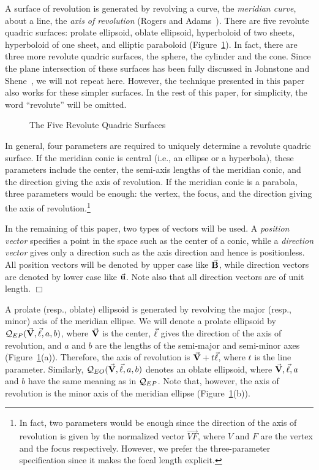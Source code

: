      A surface of revolution is generated by revolving a curve, the
{\em meridian curve}, about a line, the {\em axis of revolution}
(Rogers and Adams~\cite{rogers-adams:1990}).  There are five revolute quadric 
surfaces: prolate ellipsoid, oblate ellipsoid, hyperboloid of two sheets, 
hyperboloid of one sheet, and elliptic paraboloid (Figure~\ref{fig:revQ}).  
In fact, there are three more revolute quadric surfaces, the sphere, the 
cylinder and the cone.  Since the plane intersection of these surfaces has
been fully discussed in Johnstone and Shene~\cite{johnstone-shene:1991}, we 
will not repeat here.  However, the technique presented in this paper also
works for these simpler surfaces.  In the rest of this paper, for simplicity, 
the word ``revolute'' will be omitted.
\begin{figure}
\vspace{16.5cm}
\caption{The Five Revolute Quadric Surfaces}
\label{fig:revQ}
\end{figure}

     In general, four parameters are required to uniquely determine a revolute
quadric surface.  If the meridian conic is central (i.e., an ellipse or a 
hyperbola), these parameters include the center, the semi-axis lengths of the 
meridian conic, and  the direction giving the axis of revolution.  If the 
meridian conic is a parabola, three parameters would be enough: the vertex, 
the focus, and the direction giving the axis of revolution.\footnote{In fact,
two parameters would be enough since the direction of the axis of revolution
is given by the normalized vector $\stackrel{\longrightarrow}{VF}$, where
$V$ and $F$ are the vertex and the focus respectively.  However, we prefer the
three-parameter specification since it makes the focal length explicit.}

\begin{remark} \rm
     In the remaining of this paper, two types of vectors will be used.  
A {\em position vector} specifies a point in the space such as the center of
a conic, while a {\em direction vector} gives only a direction such as the
axis direction and hence is positionless.  All position vectors will be 
denoted by upper case like $\vec{\bf B}$, while direction vectors are denoted by
lower case like $\vec{\bf u}$.  Note also that all direction vectors are of unit 
length. $\Box$
\end{remark}

     A prolate (resp., oblate) ellipsoid is generated by revolving the major
(resp., minor) axis of the meridian ellipse.  We will denote a prolate 
ellipsoid by ${\cal Q}_{EP}(\vec{\bf V},\vec{\bf \ell},a,b)$, where $\vec{\bf V}$ is
the center, $\vec{\bf \ell}$ gives the direction of the axis of revolution, 
and $a$ and $b$ are
the lengths of the semi-major and semi-minor axes (Figure~\ref{fig:revQ}(a)).
Therefore, the axis of revolution is $\vec{\bf V}+t\vec{\bf \ell}$, where $t$ is 
the line parameter.  
Similarly, ${\cal Q}_{EO}(\vec{\bf V},\vec{\bf \ell},a,b)$ denotes an
oblate ellipsoid, where $\vec{\bf V},\vec{\bf \ell},a$ and $b$ have the same 
meaning as in ${\cal Q}_{EP}$.  Note that, however, the axis of revolution 
is the minor axis of the meridian ellipse (Figure~\ref{fig:revQ}(b)).

